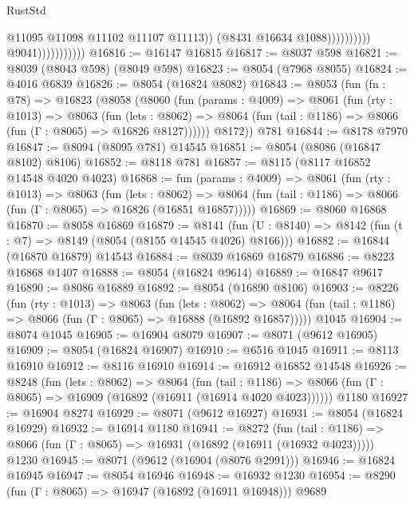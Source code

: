 \begin{lexlean}{RustStd}
\begin{coremodule}
                                                @11095
                                                @11098
                                                @11102
                                                @11107
                                                @11113))
                                            (@8431 @16634 @1088))))))))))
                          @9041)))))))))))
@16816 := @16147 @16815
@16817 := @8037 @598
@16821 := @8039 (@8043 @598) (@8049 @598)
@16823 := @8054 (@7968 @8055)
@16824 := @4016 @6839
@16826 := @8054 (@16824 @8082)
@16843 := @8053
    (fun (fn : @78) =>
    @16823
      (@8058
        (@8060
          (fun (params : @4009) =>
          @8061
            (fun (rty : @1013) =>
            @8063
              (fun (lets : @8062) =>
              @8064 (fun (tail : @1186) => @8066 (fun (Γ : @8065) => @16826 @8127))))))
        @8172))
    @781
@16844 := @8178 @7970
@16847 := @8094 (@8095 @781) @14545
@16851 := @8054 (@8086 (@16847 @8102) @8106)
@16852 := @8118 @781
@16857 := @8115 (@8117 @16852 @14548 @4020 @4023)
@16868 := fun (params : @4009) =>
  @8061
    (fun (rty : @1013) =>
    @8063
      (fun (lets : @8062) =>
      @8064 (fun (tail : @1186) => @8066 (fun (Γ : @8065) => @16826 (@16851 @16857)))))
@16869 := @8060 @16868
@16870 := @8058 @16869
@16879 := @8141
    (fun (U : @8140) => @8142 (fun (t : @7) => @8149 (@8054 (@8155 @14545 @4026) @8166)))
@16882 := @16844 (@16870 @16879) @14543
@16884 := @8039 @16869 @16879
@16886 := @8223 @16868 @1407
@16888 := @8054 (@16824 @9614)
@16889 := @16847 @9617
@16890 := @8086 @16889
@16892 := @8054 (@16890 @8106)
@16903 := @8226
    (fun (rty : @1013) =>
    @8063
      (fun (lets : @8062) =>
      @8064 (fun (tail : @1186) => @8066 (fun (Γ : @8065) => @16888 (@16892 @16857)))))
    @1045
@16904 := @8074 @1045
@16905 := @16904 @8079
@16907 := @8071 (@9612 @16905)
@16909 := @8054 (@16824 @16907)
@16910 := @6516 @1045
@16911 := @8113 @16910
@16912 := @8116 @16910
@16914 := @16912 @16852 @14548
@16926 := @8248
    (fun (lets : @8062) =>
    @8064
      (fun (tail : @1186) =>
      @8066 (fun (Γ : @8065) => @16909 (@16892 (@16911 (@16914 @4020 @4023))))))
    @1180
@16927 := @16904 @8274
@16929 := @8071 (@9612 @16927)
@16931 := @8054 (@16824 @16929)
@16932 := @16914 @1180
@16941 := @8272
    (fun (tail : @1186) => @8066 (fun (Γ : @8065) => @16931 (@16892 (@16911 (@16932 @4023)))))
    @1230
@16945 := @8071 (@9612 (@16904 (@8076 @2991)))
@16946 := @16824 @16945
@16947 := @8054 @16946
@16948 := @16932 @1230
@16954 := @8290 (fun (Γ : @8065) => @16947 (@16892 (@16911 @16948))) @9689

\end{coremodule}
\end{lexlean}
